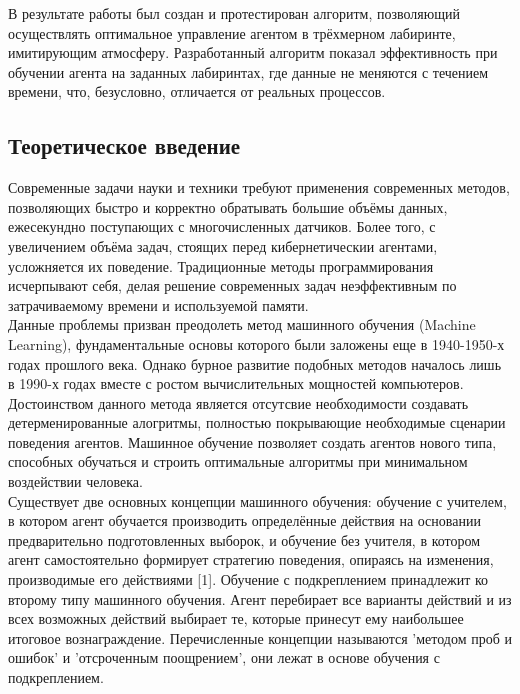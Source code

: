 \documentclass[a4paper]{report}
\theoremstyle{definition}
\theoremstyle{plain}
\theoremstyle{remark}
\theoremstyle{remark}
\theoremstyle{definition}
\begin{document}
В результате работы был создан и протестирован алгоритм, позволяющий осуществлять оптимальное управление агентом в трёхмерном лабиринте, имитирующим атмосферу. Разработанный алгоритм показал эффективность при обучении агента на заданных лабиринтах, где данные не меняются с течением времени, что, безусловно, отличается от реальных процессов.

\newpage
{}
\begin{center}
\section{Теоретическое введение}
\end{center}
\label{sec:W1}
Современные задачи науки и техники требуют применения современных методов, позволяющих быстро и корректно обратывать большие объёмы данных, ежесекундно поступающих с многочисленных датчиков. Более того, с увеличением объёма задач, стоящих перед кибернетическии агентами, усложняется их поведение. Традиционные методы программирования исчерпывают себя, делая решение современных задач неэффективным по затрачиваемому времени и используемой памяти.\\

Данные проблемы призван преодолеть метод машинного обучения (Machine Learning), фундаментальные основы которого были заложены еще в 1940-1950-х годах прошлого века. Однако бурное развитие подобных методов началось лишь в 1990-х годах вместе с ростом вычислительных мощностей компьютеров.
Достоинством данного метода является отсутсвие необходимости создавать детерменированные алогритмы, полностью покрывающие необходимые сценарии поведения агентов. Машинное обучение позволяет создать агентов нового типа, способных обучаться и строить оптимальные алгоритмы при минимальном воздействии человека.\\

Существует две основных концепции машинного обучения: обучение с учителем, в котором агент обучается производить определённые действия на основании предварительно подготовленных выборок, и обучение без учителя, в котором агент самостоятельно формирует стратегию поведения, опираясь на изменения, производимые его действиями [1]. Обучение с подкреплением принадлежит ко второму типу машинного обучения. Агент перебирает все варианты действий и из всех возможных действий выбирает те, которые принесут ему наибольшее итоговое вознаграждение. Перечисленные концепции называются 'методом проб и ошибок' и 'отсроченным поощрением', они лежат в основе обучения с подкреплением.\\
\end{document}
